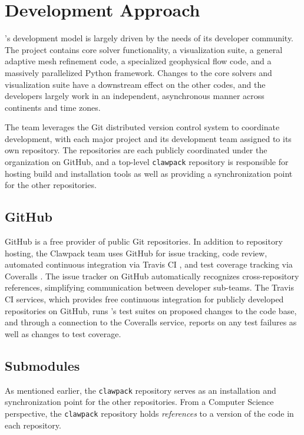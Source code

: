 %
%
%

\section{Development Approach}

\clawpack's development model is largely driven by the needs of its
developer community.  The \clawpack project contains core solver
functionality, a visualization suite, a general adaptive mesh
refinement code, a specialized geophysical flow code, and a
massively parallelized Python framework.  Changes to the core solvers
and visualization suite have a downstream effect on the other codes,
and the developers largely work in an independent, asynchronous manner
across continents and time zones. 

The \clawpack team leverages the Git distributed version control system
to coordinate development, with each major project and its development
team assigned to its own repository.  The repositories are each
publicly coordinated under the \clawpack organization on GitHub, and a
top-level \texttt{clawpack} repository is responsible for hosting
build and installation tools as well as providing a synchronization
point for the other repositories.

\subsection{GitHub}

GitHub is a free provider of public Git repositories.  In addition to
repository hosting, the Clawpack team uses GitHub for issue tracking,
code review, automated continuous integration via Travis CI \cite{travis}, 
and test coverage tracking via Coveralls \cite{coveralls}.  
The issue tracker on GitHub
automatically recognizes cross-repository references, simplifying
communication between \clawpack developer sub-teams.  The Travis CI
services, which provides free continuous integration for publicly
developed repositories on GitHub, runs \clawpack's test suites on
proposed changes to the code base, and through a connection to
the Coveralls service, reports on any test failures as well as changes
to test coverage.

\subsection{Submodules}

As mentioned earlier, the \texttt{clawpack} repository serves as an
installation and synchronization point for the other repositories.
From a Computer Science perspective, the \texttt{clawpack} repository
holds \textit{references} to a version of the code in each
repository.  

